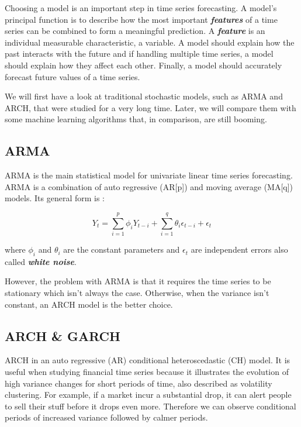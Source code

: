 \documentclass[11pt,a4paper,oneside]{book}
\begin{document}
Choosing a model is an important step in time series forecasting. A model's principal function is to describe how the most important \textit{\textbf{features}} of a time series can be combined to form a meaningful prediction. A \textit{\textbf{feature}} is an individual measurable characteristic, a variable. A model should explain how the past interacts with the future and if handling multiple time series, a model should explain how they affect each other. Finally, a model should accurately forecast future values of a time series. \cite{hyndman}

We will first have a look at traditional stochastic models, such as ARMA and ARCH, that were studied for a very long time. Later, we will compare them with some machine learning algorithms that, in comparison, are still booming.


\subsection{ARMA}

ARMA is the main statistical model for univariate linear time series forecasting. ARMA is a combination of auto regressive (AR[p]) and moving average (MA[q]) models. Its general form is : 

\begin{equation}
Y_{t} = \sum\limits_{i=1}^p \phi_{i} Y_{t-i} +  \sum\limits_{i=1}^q \theta_{i} \epsilon_{t-i} + \epsilon_{t} 
\end{equation}

where $\phi_{i}$ and $\theta_{i}$ are the constant parameters and $\epsilon_{t}$ are independent errors also called \textit{\textbf{white noise}}. 

However, the problem with ARMA is that it requires the time series to be stationary which isn't always the case. Otherwise, when the variance isn't constant, an ARCH model is the better choice. \cite{Holan}


\subsection{ARCH \& GARCH}

ARCH in an auto regressive (AR) conditional heteroscedastic (CH) model. It is useful when studying financial time series because it illustrates the evolution of high variance changes for short periods of time, also described as volatility clustering. For example, if a market incur a substantial drop, it can alert people to sell their stuff before it drops even more. Therefore we can observe conditional periods of increased variance followed by calmer periods. \cite{Holan}
\end{document}
